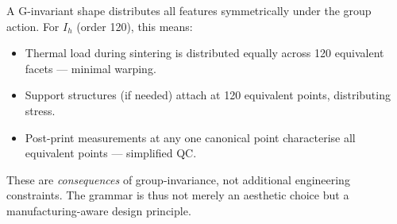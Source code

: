 \documentclass[11pt, a4paper]{article}
\newcommand{\Ih}{I_h}
\begin{document}
A G-invariant shape distributes all features symmetrically under the group
action. For $\Ih$ (order 120), this means:
\begin{itemize}
  \item Thermal load during sintering is distributed equally across 120
    equivalent facets — minimal warping.
  \item Support structures (if needed) attach at 120 equivalent points,
    distributing stress.
  \item Post-print measurements at any one canonical point characterise all
    equivalent points — simplified QC.
\end{itemize}
These are \emph{consequences} of group-invariance, not additional engineering
constraints. The grammar is thus not merely an aesthetic choice but a
manufacturing-aware design principle.
\end{document}
